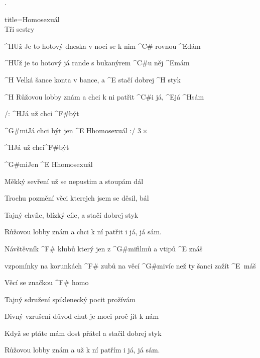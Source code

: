 .\begin{song}{title=\predtitle\centering Homosexuál \\\large Tři sestry \vspace*{-0.3cm}}  %
\begin{centerjustified}
\velky

\sloka
	^{H}Už Je to hotový dneska v noci se k nim ^{C\# \z}rovnou ^{E}dám

	^{H}Už je to hotový já rande s bukanýrem ^{C\#}u něj ^{E}mám

	^{H \z}Velká šance konta v bance, a ^{E \z}stačí dobrej ^{H \z}styk

	^{H \z}Růžovou lobby znám a chci k ni patřit ^{C\#}i já, ^{E}já ^{H}sám

	/: ^{H}Já už chci ^{F\#}být

	^{G\#mi}Já chci být jen ^{E \z H}homosexuál :/ $3 \times$

	^{H}Já už chci^{F\#}být

	^{G\#mi}Jen ^{E \z H}homosexuál

\sloka
	Měkký sevření už se nepustim a stoupám dál

	Trochu pozmění věci kterejch jsem se děsil, bál

	Tajný chvíle, blízký cíle, a stačí dobrej styk

	Růžovou lobby znám a chci k ní patřit i já, já sám.


	Návštěvník ^{F# \z}klubů který jen z ^{G\#mi}filmů a vtipů ^{E \z}znáš

	vzpomínky na korunkách ^{F\# \z}zubů na věcí ^{G\#mi}víc než ty šanci zažít ^{E \,}máš
	
	Věcí se značkou ^{F\# \z}homo

\sloka
	Tajný sdružení spiklenecký pocit prožívám

	Divný vzrušení důvod chut je moci proč jít k nám

	Když se ptáte mám dost přátel a stačil dobrej styk
	
	Růžovou lobby znám a už k ní patřím i já, já sám.


\end{centerjustified}
\setcounter{Slokočet}{0}
\end{song}
